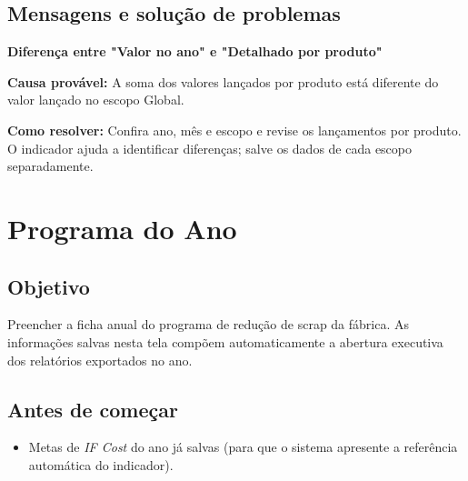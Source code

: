 \subsection*{Mensagens e solução de problemas}

\begin{remark}
\textbf{Diferença entre "Valor no ano" e "Detalhado por produto"}\par
\textbf{Causa provável:} A soma dos valores lançados por produto está diferente do valor lançado no escopo Global.\par
\textbf{Como resolver:} Confira ano, mês e escopo e revise os lançamentos por produto. O indicador ajuda a identificar diferenças; salve os dados de cada escopo separadamente.
\end{remark}

\section{Programa do Ano}

\subsection*{Objetivo}

Preencher a ficha anual do programa de redução de scrap da fábrica. As informações salvas nesta tela compõem automaticamente a abertura executiva dos relatórios exportados no ano.\par

\subsection*{Antes de começar}

\begin{itemize}
\item Metas de \emph{IF Cost} do ano já salvas (para que o sistema apresente a referência automática do indicador).
\end{itemize}

